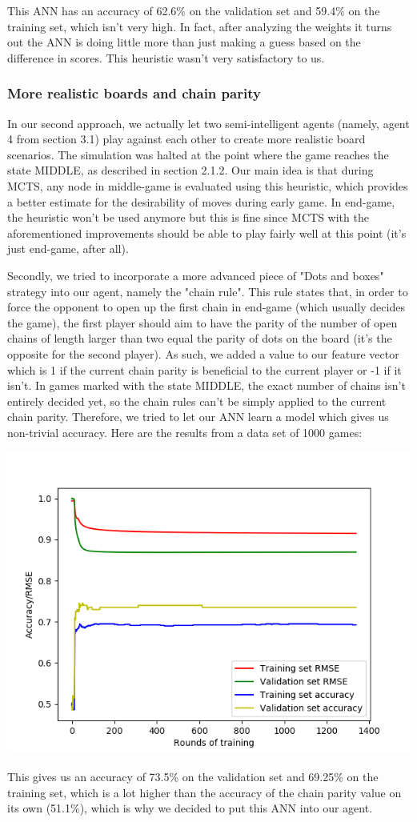 This ANN has an accuracy of 62.6\% on the validation set and 59.4\% on the training set, which isn't very high. In fact, after analyzing the weights it turns out the ANN is doing little more than just making a guess based on the difference in scores. This heuristic wasn't very satisfactory to us.

\subsubsection{More realistic boards and chain parity}

In our second approach, we actually let two semi-intelligent agents (namely, agent 4 from section 3.1) play against each other to create more realistic board scenarios. The simulation was halted at the point where the game reaches the state MIDDLE, as described in section 2.1.2. Our main idea is that during MCTS, any node in middle-game is evaluated using this heuristic, which provides a better estimate for the desirability of moves during early game. In end-game, the heuristic won't be used anymore but this is fine since MCTS with the aforementioned improvements should be able to play fairly well at this point (it's just end-game, after all).

	Secondly, we tried to incorporate a more advanced piece of "Dots and boxes" strategy into our agent, namely the "chain rule"\cite{chainRule}. This rule states that, in order to force the opponent to open up the first chain in end-game (which usually decides the game), the first player should aim to have the parity of the number of open chains of length larger than two equal the parity of dots on the board (it's the opposite for the second player). As such, we added a value to our feature vector which is 1 if the current chain parity is beneficial to the current player or -1 if it isn't. In games marked with the state MIDDLE, the exact number of chains isn't entirely decided yet, so the chain rules can't be simply applied to the current chain parity. Therefore, we tried to let our ANN learn a model which gives us non-trivial accuracy. Here are the results from a data set of 1000 games:
	
\begin{center}
\includegraphics[scale=0.65]{images/ann_rmse+accuracy_(MCTS2_1000_games).png}
\end{center}

This gives us an accuracy of 73.5\% on the validation set and 69.25\% on the training set, which is a lot higher than the accuracy of the chain parity value on its own (51.1\%), which is why we decided to put this ANN into our agent.
